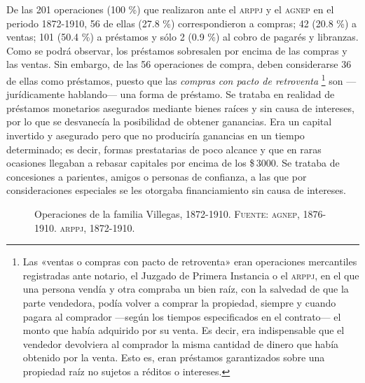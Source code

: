 \documentclass[14pt,twoside,final]{extbook} %
\let\oldfootnote\footnote
\renewcommand\footnote[1]{%
\oldfootnote{\hspace{1mm}#1}}
\begin{document}
De las 201 operaciones (100 \%) que realizaron ante el \textsc{arppj} y el \textsc{agnep} en el periodo 1872-1910, 56 de ellas (27.8 \%) correspondieron a compras; 42 (20.8 \%) a ventas; 101 (50.4 \%) a préstamos y sólo 2 (0.9 \%) al cobro de pagarés y libranzas. Como se podrá observar, los préstamos sobresalen por encima de las compras y las ventas. Sin embargo, de las 56 operaciones de compra, deben considerarse 36 de ellas como préstamos, puesto que las \emph{compras con pacto de retroventa}\footnote{Las «ventas o compras con pacto de retroventa» eran operaciones mercantiles registradas ante notario, el Juzgado de Primera Instancia o el \textsc{arppj}, en el que una persona vendía y otra compraba un bien raíz, con la salvedad de que la parte vendedora, podía volver a comprar la propiedad, siempre y cuando pagara al comprador ---según los tiempos especificados en el contrato--- el monto que había adquirido por su venta. Es decir, era indispensable que el vendedor devolviera al comprador la misma cantidad de dinero que había obtenido por la venta. Esto es, eran préstamos garantizados sobre una propiedad raíz no sujetos a réditos o intereses.} son ---jurídicamente hablando--- una forma de préstamo. Se trataba en realidad de préstamos monetarios asegurados mediante bienes raíces y sin causa de intereses, por lo que se desvanecía la posibilidad de obtener ganancias. Era un capital invertido y asegurado pero que no produciría ganancias en un tiempo determinado; es decir, formas prestatarias de poco alcance y que en raras ocasiones llegaban a rebasar capitales por encima de los \$\,3000. Se trataba de concesiones a parientes, amigos o personas de confianza, a las que por consideraciones especiales se les otorgaba financiamiento sin causa de intereses.
\begin{figure}
\centering
{}
\caption[Operaciones de la familia Villegas, 1872-1910]{Operaciones de la familia Villegas, 1872-1910. \textsc{Fuente:} \textsc{agnep}, 1876-1910. \textsc{arppj}, 1872-1910.}
\label{fig:operaciones-villegas}
\end{figure}
\end{document}
